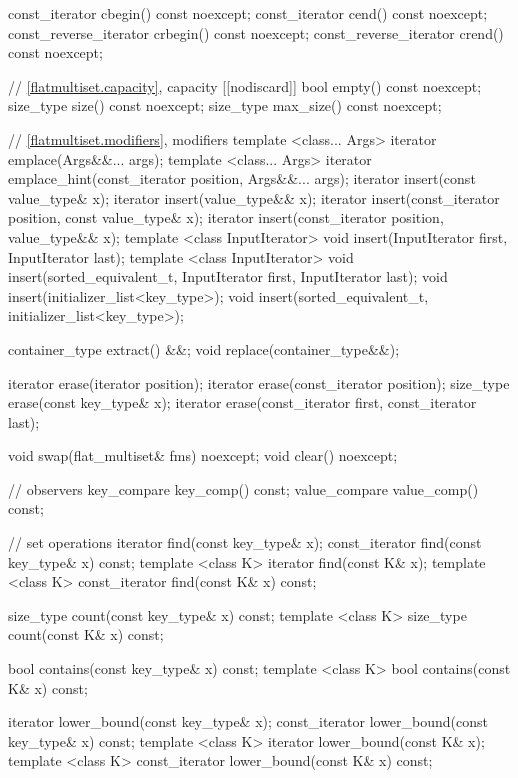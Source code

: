 \begin{codeblock}
\begin{codeblock}
\begin{codeblock}
\begin{addedblock}
\begin{codeblock}
{    const_iterator         cbegin() const noexcept;
    const_iterator         cend() const noexcept;
    const_reverse_iterator crbegin() const noexcept;
    const_reverse_iterator crend() const noexcept;

    // \ref{flatmultiset.capacity}, capacity
    [[nodiscard]] bool empty() const noexcept;
    size_type size() const noexcept;
    size_type max_size() const noexcept;

    // \ref{flatmultiset.modifiers}, modifiers
    template <class... Args> iterator emplace(Args&&... args);
    template <class... Args>
      iterator emplace_hint(const_iterator position, Args&&... args);
    iterator insert(const value_type& x);
    iterator insert(value_type&& x);
    iterator insert(const_iterator position, const value_type& x);
    iterator insert(const_iterator position, value_type&& x);
    template <class InputIterator>
      void insert(InputIterator first, InputIterator last);
    template <class InputIterator>
      void insert(sorted_equivalent_t, InputIterator first, InputIterator last);
    void insert(initializer_list<key_type>);
    void insert(sorted_equivalent_t, initializer_list<key_type>);

    container_type extract() &&;
    void replace(container_type&&);

    iterator erase(iterator position);
    iterator erase(const_iterator position);
    size_type erase(const key_type& x);
    iterator erase(const_iterator first, const_iterator last);

    void swap(flat_multiset& fms) noexcept;
    void clear() noexcept;

    // observers
    key_compare key_comp() const;
    value_compare value_comp() const;

    // set operations
    iterator find(const key_type& x);
    const_iterator find(const key_type& x) const;
    template <class K> iterator find(const K& x);
    template <class K> const_iterator find(const K& x) const;

    size_type count(const key_type& x) const;
    template <class K> size_type count(const K& x) const;

    bool contains(const key_type& x) const;
    template <class K> bool contains(const K& x) const;

    iterator lower_bound(const key_type& x);
    const_iterator lower_bound(const key_type& x) const;
    template <class K> iterator lower_bound(const K& x);
    template <class K> const_iterator lower_bound(const K& x) const;

}
\end{codeblock}
\end{addedblock}
\end{codeblock}
\end{codeblock}
\end{codeblock}
